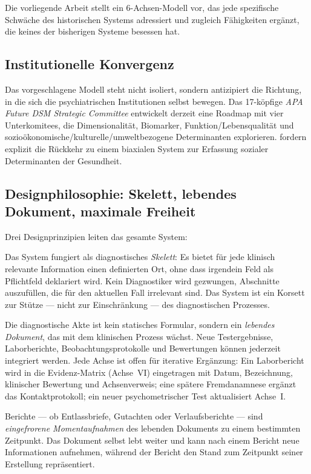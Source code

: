 \documentclass[11pt,a4paper]{article}
\begin{document}
Die vorliegende Arbeit stellt ein 6-Achsen-Modell vor, das jede spezifische Schw\"ache des historischen Systems adressiert und zugleich F\"ahigkeiten erg\"anzt, die keines der bisherigen Systeme besessen hat.

\subsection{Institutionelle Konvergenz}

Das vorgeschlagene Modell steht nicht isoliert, sondern antizipiert die Richtung, in die sich die psychiatrischen Institutionen selbst bewegen. Das 17-k\"opfige \textit{APA Future DSM Strategic Committee} entwickelt derzeit eine \glqq Roadmap\grqq{} mit vier Unterkomitees, die Dimensionalit\"at, Biomarker, Funktion/Lebensqualit\"at und sozio\"okonomische/kulturelle/umweltbezogene Determinanten explorieren. \citet{ErlichFirst2025SocialDeterminants} fordern explizit die R\"uckkehr zu einem biaxialen System zur Erfassung sozialer Determinanten der Gesundheit.


\subsection{Designphilosophie: Skelett, lebendes Dokument, maximale Freiheit}
\label{sec:designphilosophie}

Drei Designprinzipien leiten das gesamte System:

\begin{description}[style=nextline, leftmargin=1.5cm, font=\bfseries]
\item[Skelett-Prinzip] Das System fungiert als diagnostisches \textit{Skelett}: Es bietet f\"ur jede klinisch relevante Information einen definierten Ort, ohne dass irgendein Feld als Pflichtfeld deklariert wird. Kein Diagnostiker wird gezwungen, Abschnitte auszuf\"ullen, die f\"ur den aktuellen Fall irrelevant sind. Das System ist ein Korsett zur St\"utze --- nicht zur Einschr\"ankung --- des diagnostischen Prozesses.
\item[Lebendes Dokument] Die diagnostische Akte ist kein statisches Formular, sondern ein \textit{lebendes Dokument}, das mit dem klinischen Prozess w\"achst. Neue Testergebnisse, Laborberichte, Beobachtungsprotokolle und Bewertungen k\"onnen jederzeit integriert werden. Jede Achse ist offen f\"ur iterative Erg\"anzung: Ein Laborbericht wird in die Evidenz-Matrix (Achse~VI) eingetragen mit Datum, Bezeichnung, klinischer Bewertung und Achsenverweis; eine sp\"atere Fremdanamnese erg\"anzt das Kontaktprotokoll; ein neuer psychometrischer Test aktualisiert Achse~I.
\item[Bericht als Snapshot] Berichte --- ob Entlassbriefe, Gutachten oder Verlaufsberichte --- sind \textit{eingefrorene Momentaufnahmen} des lebenden Dokuments zu einem bestimmten Zeitpunkt. Das Dokument selbst lebt weiter und kann nach einem Bericht neue Informationen aufnehmen, w\"ahrend der Bericht den Stand zum Zeitpunkt seiner Erstellung repr\"asentiert.
\end{description}
\end{document}
